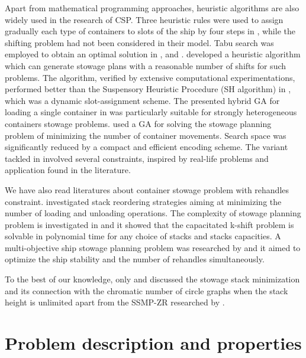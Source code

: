 \documentclass[review,3p,times,authoryear,12pt]{elsarticle}
\begin{document}
Apart from mathematical programming approaches, heuristic algorithms are also widely used in the research of CSP.
Three heuristic rules were used to assign gradually each type of containers to slots of the ship by four steps in \cite{scott1978loading}, while the shifting problem had not been considered in their model.
Tabu search was employed to obtain an optimal solution in \cite{wilson2001container}, \cite{bortfeldt2003parallel} and \cite{monaco2014terminal}.
\cite{ding2015stowage} developed a heuristic algorithm which can generate stowage plans with a reasonable number of shifts for such problems.
The algorithm, verified by extensive computational experimentations, performed better than the Suspensory Heuristic Procedure (SH algorithm) in \cite{avriel1998stowage}, which was a dynamic slot-assignment scheme.
The presented hybrid GA for loading a single container in \cite{bortfeldt2001hybrid} was particularly suitable for strongly heterogeneous containers stowage problems.
\cite{dubrovsky2002genetic}  used a GA for solving the stowage planning problem of minimizing the number of container movements.
Search space was significantly reduced by a compact and efficient encoding scheme.
The variant tackled in \cite{cohen2017container} involved several constraints, inspired by real-life problems and application found in the literature.

We have also read literatures about container stowage problem with rehandles constraint.
\cite{malucelli2008stack} investigated stack reordering strategies aiming at minimizing the number of loading and unloading operations.
The complexity of stowage planning problem is investigated in \cite{tierney2014complexity} and it showed that the capacitated k-shift problem is solvable in polynomial time for any choice of stacks and stacks capacities.
A multi-objective ship stowage planning problem was researched by \cite{zhang2016multiobjective} and it aimed to optimize the ship stability and the number of rehandles simultaneously.

To the best of our knowledge, only \cite{avriel2000container} and \cite{jensen2010complexity} discussed the stowage stack minimization and its connection with the chromatic number of circle graphs when the stack height is unlimited apart from the SSMP-ZR researched by \cite{wang2014stowage}.


\section{Problem description and properties}
\label{sec:pd}
\end{document}
